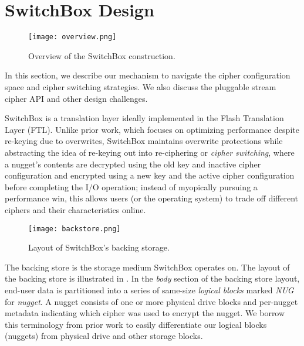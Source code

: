 \section{SwitchBox Design}\label{sec:design}

\begin{figure}[t]
   \centering
   \texttt{[image: overview.png]}
   \caption{Overview of the SwitchBox construction.}\label{fig:overview}
\end{figure}

In this section, we describe our mechanism to navigate the cipher configuration
space and cipher switching strategies. We also discuss the pluggable stream
cipher API and other design challenges.

SwitchBox is a translation layer ideally implemented in the Flash Translation
Layer (FTL).  
Unlike prior work, which focuses on optimizing performance despite
re-keying due to overwrites, SwitchBox maintains overwrite protections while
abstracting the idea of re-keying out into re-ciphering or \emph{cipher
switching}, where a nugget's contents are decrypted using the old key and
inactive cipher configuration and encrypted using a new key and the active
cipher configuration before completing the I/O operation; instead of myopically
pursuing a performance win, this allows users (or the operating system) to trade off different ciphers and
their characteristics online.

\begin{figure}[t]
\centering
\texttt{[image: backstore.png]}
 \caption{Layout of SwitchBox's backing storage.}\label{fig:backstore2}
\end{figure}

The backing store is the storage medium SwitchBox operates on. The layout of the
backing store is illustrated in . In the \textit{body}
section of the backing store layout, end-user data is partitioned into a series
of same-size \emph{logical blocks} marked \textit{NUG} for \emph{nugget}. A
nugget consists of one or more physical drive blocks and per-nugget metadata
indicating which cipher was used to encrypt the nugget. We borrow this
terminology from prior work to easily differentiate our logical blocks (nuggets)
from physical drive and other storage blocks.

